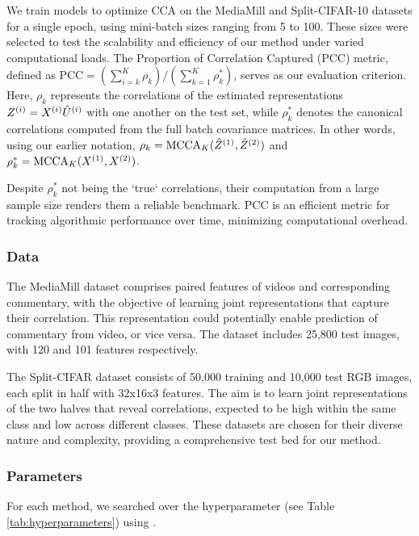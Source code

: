 We train models to optimize CCA on the MediaMill and Split-CIFAR-10 datasets for a single epoch, using mini-batch sizes ranging from 5 to 100.
These sizes were selected to test the scalability and efficiency of our method under varied computational loads. The Proportion of Correlation Captured (PCC) metric, defined as \( \text{PCC} = (\sum_{i=k}^K \rho_k)/ ({\sum_{k=1}^K \rho_k^*}) \), serves as our evaluation criterion.
Here, $\rho_k$ represents the correlations of the estimated representations $Z^{(i)}=X^{(i)}\hat{U}^{(i)}$ with one another on the test set, while $\rho_k^*$ denotes the canonical correlations computed from the full batch covariance matrices.
In other words, using our earlier notation, $\rho_k = \operatorname{MCCA}_K(\hat{Z}^{(1)}, \hat{Z}^{(2)})$ and $\rho_k^* = \operatorname{MCCA}_K(X^{(1)}, X^{(2)})$.

Despite $\rho_k^*$ not being the `true` correlations, their computation from a large sample size renders them a reliable benchmark.
PCC is an efficient metric for tracking algorithmic performance over time, minimizing computational overhead\citep{meng2021online, gemp2022generalized, ma2015finding, ge2016efficient}.

\subsubsection{Data}
The MediaMill dataset \citep{gemert2008visual} comprises paired features of videos and corresponding commentary, with the objective of learning joint representations that capture their correlation.
This representation could potentially enable prediction of commentary from video, or vice versa.
The dataset includes 25,800 test images, with 120 and 101 features respectively.

The Split-CIFAR dataset \citep{meng2021online} consists of 50,000 training and 10,000 test RGB images, each split in half with 32x16x3 features.
The aim is to learn joint representations of the two halves that reveal correlations, expected to be high within the same class and low across different classes.
These datasets are chosen for their diverse nature and complexity, providing a comprehensive test bed for our method.

\subsubsection{Parameters} For each method, we searched over the hyperparameter (see Table \ref{tab:hyperparameters}) using \citet{wandb}.


